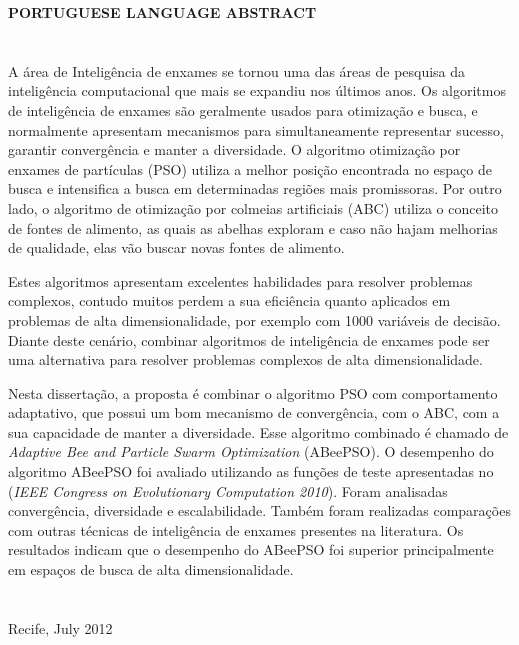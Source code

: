 \begin{flushbottom}
\textbf{PORTUGUESE LANGUAGE ABSTRACT}
\\
\\
\\
A \'{a}rea de Intelig\^{e}ncia de enxames se tornou uma das \'{a}reas de pesquisa da intelig\^{e}ncia computacional que mais se expandiu nos \'{u}ltimos anos. Os algoritmos de intelig\^{e}ncia de enxames s\~{a}o geralmente usados para otimiza\c{c}\~{a}o e busca, e normalmente apresentam mecanismos para simultaneamente representar sucesso, garantir converg\^{e}ncia e manter a diversidade. O algoritmo otimiza\c{c}\~{a}o por enxames de part\'{i}culas (PSO) utiliza a melhor posi\c{c}\~{a}o encontrada no espa\c{c}o de busca e intensifica a busca em determinadas regi\~{o}es mais promissoras. Por outro lado, o algoritmo de otimiza\c{c}\~{a}o por colmeias artificiais (ABC) utiliza o conceito de fontes de alimento, as quais as abelhas exploram e caso n\~{a}o hajam melhorias de qualidade, elas v\~{a}o buscar novas fontes de alimento.

Estes algoritmos apresentam excelentes habilidades para resolver problemas complexos, contudo muitos perdem a sua efici\^{e}ncia quanto aplicados em problemas de alta dimensionalidade, por exemplo com 1000 vari\'{a}veis de decis\~{a}o. Diante deste cen\'{a}rio, combinar algoritmos de intelig\^{e}ncia de enxames pode ser uma alternativa para resolver problemas complexos de alta dimensionalidade.

Nesta disserta\c{c}\~{a}o, a proposta \'{e} combinar o algoritmo PSO com comportamento adaptativo, que possui um bom mecanismo de converg\^{e}ncia, com o ABC, com a sua capacidade de manter a diversidade. Esse algoritmo combinado \'{e} chamado de \textit{Adaptive Bee and Particle Swarm Optimization} (ABeePSO). O desempenho do algoritmo ABeePSO foi avaliado utilizando as fun\c{c}\~{o}es de teste apresentadas no (\textit{IEEE Congress on Evolutionary Computation 2010}). Foram analisadas  converg\^{e}ncia, diversidade e escalabilidade. Tamb\'{e}m foram realizadas compara\c{c}\~{o}es com outras t\'{e}cnicas de intelig\^{e}ncia de enxames presentes na literatura. Os resultados indicam que o desempenho do ABeePSO foi superior principalmente em espa\c{c}os de busca de alta dimensionalidade.  	
\\
\\
\\  Recife, July 2012
\end{flushbottom}
\newpage
